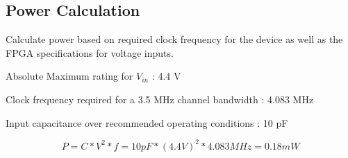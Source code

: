 \documentclass[dvips,10pt,twocolumn]{article}
\begin{document}
  \subsection{Power Calculation}
  
  Calculate power based on required clock frequency for the device as well as the
  FPGA specifications for voltage inputs.
  
  Absolute Maximum rating for $V_{in}$ : 4.4 V
  
  Clock frequency required for a 3.5 MHz channel bandwidth : 4.083 MHz
  
  Input capacitance over recommended operating conditions : 10 pF
  \begin{center}
  \begin{equation}
  P = C * V^2 * f = 10 pF * (4.4 V)^2 * 4.083 MHz = 0.18 mW
  \end{equation}
  \end{center}
  

{}

\end{document}

